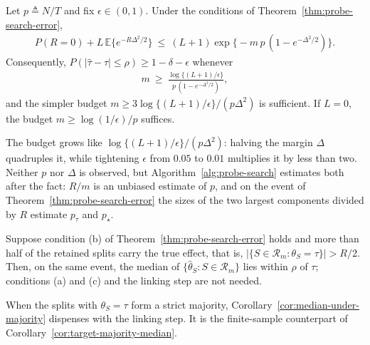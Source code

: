 \begin{corollary}
\label{cor:budget-rule}
\normalfont

Let $p\triangleq N/T$ and fix $\epsilon\in(0,1)$. Under the conditions of Theorem~\ref{thm:probe-search-error},
\begin{align}\label{eq:sampling-failure-closed-form}
	P(R=0)+L\,\mathbb E\bigl\{e^{-R\Delta^2/2}\bigr\}
	\ \le\
	(L+1)\exp\bigl\{-m\,p\,(1-e^{-\Delta^2/2})\bigr\}.
\end{align}
Consequently, $P(|\widehat\tau-\tau|\le\rho)\ge1-\delta-\epsilon$ whenever
\begin{align}\label{eq:budget-rule}
	m\ \ge\ \frac{\log\{(L+1)/\epsilon\}}{p\,(1-e^{-\Delta^2/2})},
\end{align}
and the simpler budget $m\ge3\log\{(L+1)/\epsilon\}/(p\Delta^2)$ is sufficient. If $L=0$, the budget $m\ge\log(1/\epsilon)/p$ suffices.

\end{corollary}

The budget grows like $\log\{(L+1)/\epsilon\}/(p\Delta^2)$: halving the margin $\Delta$ quadruples it, while tightening $\epsilon$ from $0.05$ to $0.01$ multiplies it by less than two. Neither $p$ nor $\Delta$ is observed, but Algorithm~\ref{alg:probe-search} estimates both after the fact: $R/m$ is an unbiased estimate of $p$, and on the event of Theorem~\ref{thm:probe-search-error} the sizes of the two largest components divided by $R$ estimate $p_\tau$ and $p_\star$.

\begin{corollary}
\label{cor:median-under-majority}
\normalfont

Suppose condition (b) of Theorem~\ref{thm:probe-search-error} holds and more than half of the retained splits carry the true effect, that is, $|\{S\in\mathcal R_m:\theta_S=\tau\}|>R/2$. Then, on the same event, the median of $\{\widehat\theta_S:S\in\mathcal R_m\}$ lies within $\rho$ of $\tau$; conditions (a) and (c) and the linking step are not needed.

\end{corollary}

When the splits with $\theta_S=\tau$ form a strict majority, Corollary~\ref{cor:median-under-majority} dispenses with the linking step. It is the finite-sample counterpart of Corollary~\ref{cor:target-majority-median}.
